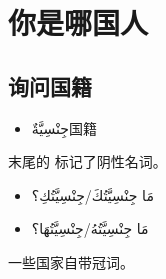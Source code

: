 \chapter{你是哪国人}

\section{询问国籍}

\begin{itemize}
    \item \ac{جِنْسِيَّةٌ}{国籍}
\end{itemize}

末尾的 标记了阴性名词。

\begin{Arabic}
    \begin{itemize}
        \item مَا جِنْسِيَّتُكَ/جِنْسِيَّتُكِ؟
        \item مَا جِنْسِيَّتُهُ/جِنْسِيَّتُهَا؟
    \end{itemize}
\end{Arabic}

一些国家自带冠词。


